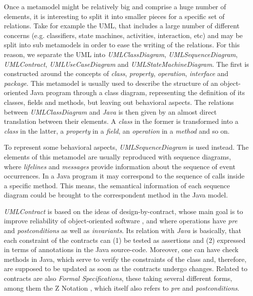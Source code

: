 \documentclass[tuberlin,cic,tc,english,noabntcite]{iiufrgs}
\begin{document}
Once a metamodel might be relatively big and comprise a huge number of elements, it is interesting to split it into smaller pieces for a specific set of relations. Take for example the UML, that includes a large number of different concerns (e.g. classifiers, state machines, activities, interaction, etc) and may be split into sub metamodels in order to ease the writing of the relations. For this reason, we separate the UML into \emph{UMLClassDiagram}, \emph{UMLSequenceDiagram}, \emph{UMLContract}, \emph{UMLUseCaseDiagram} and \emph{UMLStateMachineDiagram}. The first is constructed around the concepts of \emph{class}, \emph{property}, \emph{operation}, \emph{interface} and \emph{package}. This metamodel is usually used to describe the structure of an object-oriented Java program through a class diagram, representing the definition of its classes, fields and methods, but leaving out behavioral aspects. The relations between \emph{UMLClassDiagram} and \emph{Java} is then given by an almost direct translation between their elements. A \emph{class} in the former is transformed into a \emph{class} in the latter, a \emph{property} in a \emph{field}, an \emph{operation} in a \emph{method} and so on.

To represent some behavioral aspects, \emph{UMLSequenceDiagram} is used instead. The elements of this metamodel are usually reproduced with sequence diagrams, where \emph{lifelines} and \emph{messages} provide information about the sequence of event occurrences. In a Java program it may correspond to the sequence of calls inside a specific method. This means, the semantical information of each sequence diagram could be brought to the correspondent method in the Java model.

\emph{UMLContract} is based on the ideas of design-by-contract, whose main goal is to improve reliability of object-oriented software \citep{meyer1992applying}, and where operations have \emph{pre} and \emph{postconditions} as well as \emph{invariants}. Its relation with \emph{Java} is basically, that each constraint of the contracts can (1) be tested as assertions and (2) expressed in terms of annotations in the Java source-code. Moreover, one can have check methods in Java, which serve to verify the constraints of the class and, therefore, are supposed to be updated as soon as the contracts undergo changes. Related to contracts are also \emph{Formal Specifications}, these taking several different forms, among them the Z Notation \citep{spivey1992z}, which itself also refers to \emph{pre} and \emph{postconditions}.
\end{document}
